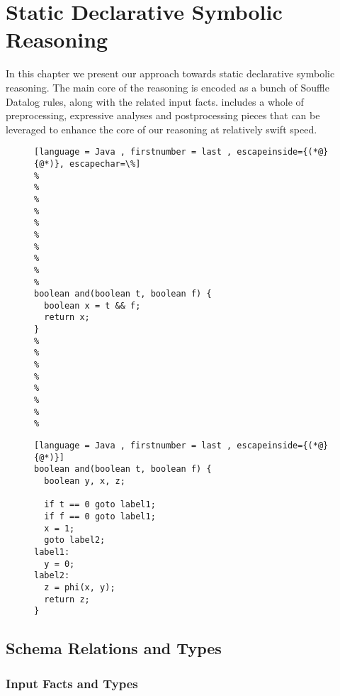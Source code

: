 \chapter{Static Declarative Symbolic Reasoning}\label{c:main-content}

In this chapter we present our approach towards static declarative
symbolic reasoning. The main core of the reasoning is encoded as a
bunch of Souffle Datalog rules, along with the related input facts.
\doop{} includes a whole of preprocessing, expressive analyses and
postprocessing pieces that can be leveraged to enhance the core of
our reasoning at relatively swift speed.

\begin{figure}[th]
  \begin{minipage}{.5\textwidth}
\begin{lstlisting}[language = Java , firstnumber = last , escapeinside={(*@}{@*)}, escapechar=\%]
%
%
%
%
%
%
%
%
%
%
boolean and(boolean t, boolean f) {
  boolean x = t && f;
  return x;
}
%
%
%
%
%
%
%
%

\end{lstlisting}
\label{sc:java-code}
\end{minipage}\hfill
\begin{minipage}{.5\textwidth}
\begin{lstlisting}[language = Java , firstnumber = last , escapeinside={(*@}{@*)}]
boolean and(boolean t, boolean f) {
  boolean y, x, z;

  if t == 0 goto label1;
  if f == 0 goto label1;
  x = 1;
  goto label2;
label1:
  y = 0;
label2:
  z = phi(x, y);
  return z;
}
\end{lstlisting}
\label{sc:soot-code}
\end{minipage}
\end{figure}


\section{Schema Relations and Types}\label{s:schema-relations-types}

\subsection{Input Facts and Types}

